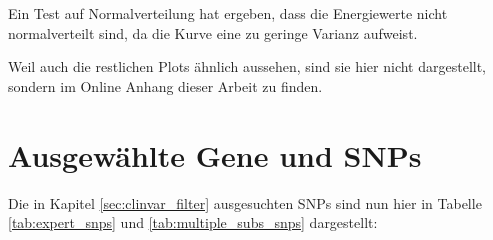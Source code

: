 Ein Test auf Normalverteilung  hat ergeben, dass die Energiewerte nicht normalverteilt sind, da die Kurve eine zu geringe Varianz aufweist. 

Weil auch die restlichen Plots ähnlich aussehen, sind sie hier nicht dargestellt, sondern im Online Anhang dieser Arbeit zu finden.



\section{Ausgewählte Gene und SNPs}
Die in Kapitel \ref{sec:clinvar_filter} ausgesuchten \ac{SNP}s sind nun hier in Tabelle \ref{tab:expert_snps} und \ref{tab:multiple_subs_snps} dargestellt:

\begin{table}[]
    \centering
    \caption{Tabelle aller Gene des \emph{expert panels} mit mindestens 10 pathogenen \ac{SNP}s. Die verwendeten Gene sind grün markiert.}
    \label{tab:expert_snps}
\end{table}

